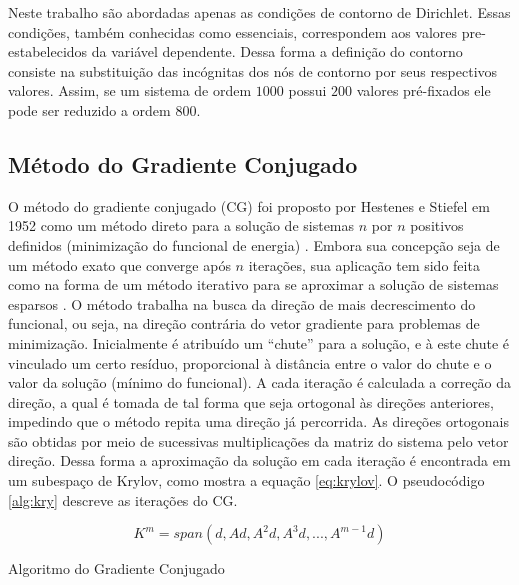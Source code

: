 \documentclass[
    12pt,               %
    openright,          %
    oneside,
    a4paper,            %
    english,            %
    french,             %
    spanish,            %
    brazil              %
    ]{abntex2}
\begin{document}
Neste trabalho são abordadas apenas as condições de contorno de Dirichlet. Essas condições, também conhecidas como essenciais, correspondem aos valores pre-estabelecidos da variável dependente. Dessa forma a definição do contorno consiste na substituição das incógnitas dos nós de contorno por seus respectivos valores. Assim, se um sistema de ordem $1000$ possui $200$ valores pré-fixados ele pode ser reduzido a ordem $800$.

\subsection{Método do Gradiente Conjugado}
O método do gradiente conjugado (CG) foi proposto por Hestenes e Stiefel em 1952 como um método direto para a solução de sistemas $n$ por $n$ positivos definidos (minimização do funcional de energia) \cite{burdenFaires}.
Embora sua concepção seja de um método exato que converge após $n$ iterações, sua aplicação tem sido feita como na forma de um método iterativo para se aproximar a solução de sistemas esparsos  \cite{Barrett1995}.
O método trabalha na busca da direção de mais decrescimento do funcional, ou seja, na direção contrária do vetor gradiente para problemas de minimização. Inicialmente é atribuído um ``chute'' para a solução, e à este chute é vinculado um certo resíduo, proporcional à distância entre o valor do chute e o valor da solução (mínimo do funcional). A cada iteração é calculada a correção da direção, a qual é tomada de tal forma que seja ortogonal às direções anteriores, impedindo que o método repita uma direção já percorrida. As direções ortogonais são obtidas por meio de sucessivas multiplicações da matriz do sistema pelo vetor direção. Dessa forma a aproximação da solução em cada iteração é encontrada em um subespaço de Krylov, como mostra a equação \ref{eq:krylov}. O pseudocódigo \ref{alg:kry} descreve as iterações do CG.

\begin{equation}
\label{eq:krylov}
K^m = span(d, Ad, A^2d, A^3d, ..., A^{m-1}d)
\end{equation}

\begin{algorithm}	
	\caption{\label{alg:kry}Algoritmo do Gradiente Conjugado} 
	\begin{algorithmic}[1]
		\EndIf
		\EndFor
	\end{algorithmic}
\end{algorithm}
\end{document}
